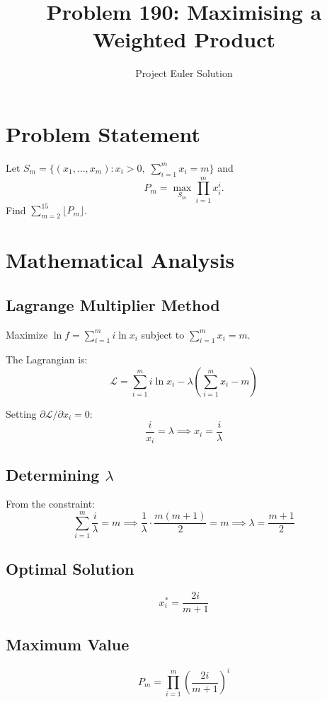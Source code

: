 \documentclass[12pt]{article}
\title{Problem 190: Maximising a Weighted Product}
\author{Project Euler Solution}
\date{}
\begin{document}
\maketitle

\section{Problem Statement}

Let $S_m = \{(x_1, \ldots, x_m) : x_i > 0,\; \sum_{i=1}^m x_i = m\}$ and
\[
P_m = \max_{S_m} \prod_{i=1}^m x_i^i.
\]
Find $\displaystyle\sum_{m=2}^{15} \lfloor P_m \rfloor$.

\section{Mathematical Analysis}

\subsection{Lagrange Multiplier Method}

Maximize $\ln f = \sum_{i=1}^m i \ln x_i$ subject to $\sum_{i=1}^m x_i = m$.

The Lagrangian is:
\[
\mathcal{L} = \sum_{i=1}^m i \ln x_i - \lambda \left(\sum_{i=1}^m x_i - m\right)
\]

Setting $\partial \mathcal{L}/\partial x_i = 0$:
\[
\frac{i}{x_i} = \lambda \implies x_i = \frac{i}{\lambda}
\]

\subsection{Determining $\lambda$}

From the constraint:
\[
\sum_{i=1}^m \frac{i}{\lambda} = m \implies \frac{1}{\lambda} \cdot \frac{m(m+1)}{2} = m \implies \lambda = \frac{m+1}{2}
\]

\subsection{Optimal Solution}

\[
x_i^* = \frac{2i}{m+1}
\]

\subsection{Maximum Value}

\[
P_m = \prod_{i=1}^m \left(\frac{2i}{m+1}\right)^i
\]
\end{document}
